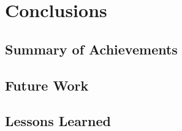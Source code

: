 \chapter{Conclusions}

\section{Summary of Achievements}

\section{Future Work}

\section{Lessons Learned}
